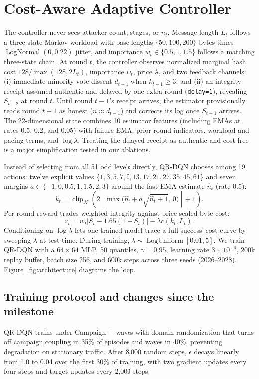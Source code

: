 \documentclass[10pt,twocolumn]{article}
\begin{document}
\section{Cost-Aware Adaptive Controller}
The controller never sees attacker count, stages, or $n_t$. Message length $L_t$ follows a three-state Markov workload with base lengths $\{50,100,200\}$ bytes times $\operatorname{LogNormal}(0,0.22)$ jitter, and importance $w_t\in\{0.5,1,1.5\}$ follows a matching three-state chain. At round $t$, the controller observes normalized marginal hash cost $128/\max(128,2L_t)$, importance $w_t$, price $\lambda$, and two feedback channels: (i) immediate minority-vote dissent $d_{t-1}$ when $k_{t-1}\geq 3$; and (ii) an integrity receipt assumed authentic and delayed by one extra round (\texttt{delay=1}), revealing $S_{t-2}$ at round $t$. Until round $t-1$'s receipt arrives, the estimator provisionally reads round $t-1$ as honest ($n\approx d_{t-1}$) and corrects its log once $S_{t-1}$ arrives. The 22-dimensional state combines 10 estimator features (including EMAs at rates 0.5, 0.2, and 0.05) with failure EMA, prior-round indicators, workload and pacing terms, and $\log\lambda$. Treating the delayed receipt as authentic and cost-free is a major simplification tested in our ablations.

Instead of selecting from all 51 odd levels directly, QR-DQN chooses among 19 actions: twelve explicit values $\{1,3,5,7,9,13,17,21,27,35,45,61\}$ and seven margins $a\in\{-1,0,0.5,1,1.5,2,3\}$ around the fast EMA estimate $\hat n_t$ (rate 0.5):
\begin{equation}\label{eq:action}
 k_t=\operatorname{clip}_{\mathcal K}\!\left(2\left\lceil\max\!\big(\hat n_t+a\sqrt{\hat n_t+1},\,0\big)\right\rceil+1\right).
\end{equation}
Per-round reward trades weighted integrity against price-scaled byte cost:
\begin{equation}\label{eq:reward}
r_t=w_t\big[S_t-1.65(1-S_t)\big]-\lambda c(k_t,L_t).
\end{equation}
Conditioning on $\log\lambda$ lets one trained model trace a full success--cost curve by sweeping $\lambda$ at test time. During training, $\lambda\sim\operatorname{LogUniform}[0.01,5]$. We train QR-DQN \citep{dabney2018qrdqn} with a $64\times64$ MLP, 50 quantiles, $\gamma=0.95$, learning rate $3\times10^{-4}$, 200k replay buffer, batch size 256, and 600k steps across three seeds (2026--2028). Figure~\ref{fig:architecture} diagrams the loop.

\subsection{Training protocol and changes since the milestone}
QR-DQN trains under Campaign + waves with domain randomization that turns off campaign coupling in 35\% of episodes and waves in 40\%, preventing degradation on stationary traffic. After 8,000 random steps, $\epsilon$ decays linearly from 1.0 to 0.04 over the first 30\% of training, with two gradient updates every four steps and target updates every 2,000 steps.
\end{document}
